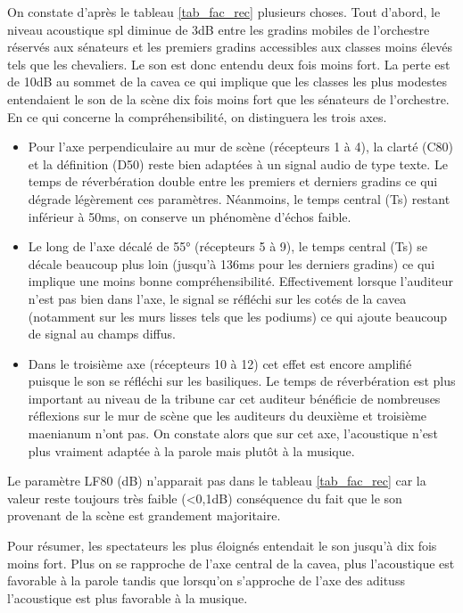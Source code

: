  
On constate d'après le tableau \ref{tab_fac_rec} plusieurs choses. Tout d'abord, le niveau acoustique \gls{spl} diminue de 3dB entre les gradins mobiles de l'orchestre réservés aux sénateurs et les premiers gradins accessibles aux classes moins élevés tels que les chevaliers. Le son est donc entendu deux fois moins fort. La perte est de 10dB au sommet de la cavea ce qui implique que les classes les plus modestes entendaient le son de la scène dix fois moins fort que les sénateurs de l'orchestre. En ce qui concerne la compréhensibilité, on distinguera les trois axes.
\begin{itemize}
\item Pour l'axe perpendiculaire au mur de scène (récepteurs 1 à 4), la clarté (\gls{C80}) et la définition (\gls{D50}) reste bien adaptées à un signal audio de type texte. Le temps de réverbération double entre les premiers et derniers gradins ce qui dégrade légèrement ces paramètres. Néanmoins, le temps central (\gls{Ts}) restant inférieur à 50ms, on conserve un phénomène d'échos faible.
\item Le long de l'axe décalé de 55° (récepteurs 5 à 9), le temps central (\gls{Ts}) se décale beaucoup plus loin (jusqu'à 136ms pour les derniers gradins) ce qui implique une moins bonne compréhensibilité. Effectivement lorsque l'auditeur n'est pas bien dans l'axe, le signal se réfléchi sur les cotés de la \gls{cavea} (notamment sur les murs lisses tels que les \glspl{podium}) ce qui ajoute beaucoup de signal au champs diffus.  
\item Dans le troisième axe (récepteurs 10 à 12) cet effet est encore amplifié puisque le son se réfléchi sur les \glspl{basilique}. Le temps de réverbération est plus important au niveau de la tribune car cet auditeur bénéficie de nombreuses réflexions sur le mur de scène que les auditeurs du deuxième et troisième \gls{maenianum} n'ont pas. On constate alors que sur cet axe, l'acoustique n'est plus vraiment adaptée à la parole mais plutôt à la musique.
\end{itemize}
Le paramètre \gls{LF80} (dB) n'apparait pas dans le tableau \ref{tab_fac_rec} car la valeur reste toujours très faible (<0,1dB) conséquence du fait que le son provenant de la scène est grandement majoritaire.

Pour résumer, les spectateurs les plus éloignés entendait le son jusqu'à dix fois moins fort. Plus on se rapproche de l'axe central de la \gls{cavea}, plus l'acoustique est favorable à la parole tandis que lorsqu'on s'approche de l'axe des \glspl{aditus} l'acoustique est plus favorable à la musique.

